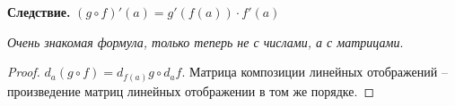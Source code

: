 \textbf{Следствие.} $(g \circ f)'(a) = g'(f(a)) \cdot f'(a)$

\textit{Очень знакомая формула, только теперь не с числами, 
а с матрицами}.
\begin{proof}
    $d_a(g \circ f) = d_{f(a)} g \circ d_a f$. 
    Матрица композиции линейных отображений -- произведение 
    матриц линейных отображении в том же порядке.
\end{proof}
